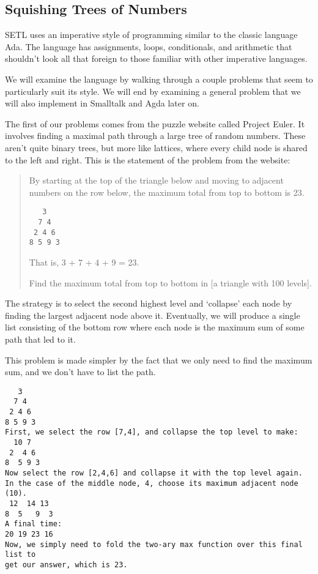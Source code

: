 \documentclass[11pt]{article}
\begin{document}
\subsection{Squishing Trees of Numbers}

SETL uses an imperative style of programming similar to the classic language
Ada. The language has assignments, loops, conditionals, and arithmetic that
shouldn't look all that foreign to those familiar with other imperative
languages. 

We will examine the language by walking through a couple problems that seem
to particularly suit its style. We will end by examining a general problem
that we will also implement in Smalltalk and Agda later on. 

The first of our problems comes from the puzzle website called Project
Euler. It involves finding a maximal path through a large tree of random
numbers. These aren't quite binary trees, but more like lattices, where every
child node is shared to the left and right. This is the statement of the problem
from the website:

\begin{quote}
By starting at the top of the triangle below and moving to adjacent numbers on
the row below, the maximum total from top to bottom is 23.

\begin{verbatim}
   3
  7 4
 2 4 6
8 5 9 3
\end{verbatim}

That is, 3 + 7 + 4 + 9 = 23.

Find the maximum total from top to bottom in [a triangle with 100 levels].
\end{quote}

The strategy is to select the second highest level and `collapse' each node by
finding the largest adjacent node above it. Eventually, we will produce a
single list consisting of the bottom row where each node is the maximum sum of
some path that led to it.

This problem is made simpler by the fact that we only need to find the maximum
sum, and we don't have to list the path. 

\begin{verbatim}
   3
  7 4
 2 4 6
8 5 9 3
First, we select the row [7,4], and collapse the top level to make:
  10 7
 2  4 6
8  5 9 3
Now select the row [2,4,6] and collapse it with the top level again. 
In the case of the middle node, 4, choose its maximum adjacent node (10).
 12  14 13 
8  5   9  3
A final time:
20 19 23 16
Now, we simply need to fold the two-ary max function over this final list to
get our answer, which is 23.
\end{verbatim}
\end{document}
